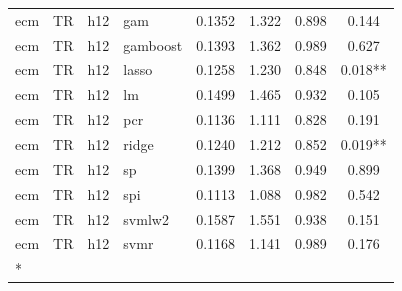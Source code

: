 \begin{ThreePartTable}
\begin{longtable}[t]{llclcccc}
ecm & TR & h12 & gam & 0.1352 & 1.322 & 0.898 & 0.144\\
ecm & TR & h12 & gamboost & 0.1393 & 1.362 & 0.989 & 0.627\\
ecm & TR & h12 & lasso & 0.1258 & 1.230 & 0.848 & 0.018**\\
ecm & TR & h12 & lm & 0.1499 & 1.465 & 0.932 & 0.105\\
ecm & TR & h12 & pcr & 0.1136 & 1.111 & 0.828 & 0.191\\
ecm & TR & h12 & ridge & 0.1240 & 1.212 & 0.852 & 0.019**\\
ecm & TR & h12 & sp & 0.1399 & 1.368 & 0.949 & 0.899\\
ecm & TR & h12 & spi & 0.1113 & 1.088 & 0.982 & 0.542\\
ecm & TR & h12 & svmlw2 & 0.1587 & 1.551 & 0.938 & 0.151\\
ecm & TR & h12 & svmr & 0.1168 & 1.141 & 0.989 & 0.176\\*
\end{longtable}
\end{ThreePartTable}
\endgroup{}
